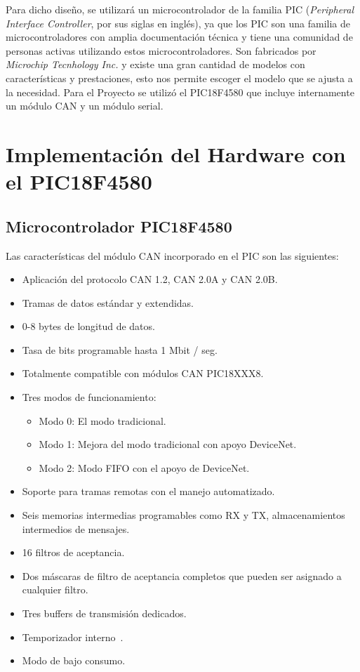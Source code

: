 

Para dicho diseño, se utilizará un microcontrolador de la familia PIC (\textit{Peripheral Interface Controller}, por sus siglas en inglés), ya que los PIC son una familia de microcontroladores con amplia documentación técnica y tiene una comunidad de personas activas utilizando estos microcontroladores. 
Son fabricados por \textit{Microchip Tecnhology Inc.} y existe una gran cantidad de modelos con características y prestaciones, esto nos permite escoger el modelo que se ajusta a la necesidad. 
Para el Proyecto se utilizó el PIC18F4580 que incluye internamente un módulo CAN y un módulo serial. 

\section{Implementación del Hardware con el PIC18F4580}
\subsection{Microcontrolador PIC18F4580}

Las características del módulo CAN incorporado en el PIC son las siguientes:
\begin{itemize}
	\item Aplicación del protocolo CAN 1.2,
	CAN 2.0A y CAN 2.0B.
	\item Tramas de datos estándar y extendidas.
	\item 0-8 bytes de longitud de datos.
	\item Tasa de bits programable hasta 1 Mbit / seg.
	\item Totalmente compatible con módulos CAN PIC18XXX8.
	\item Tres modos de funcionamiento:
	\begin{itemize}
		\item Modo 0: El modo tradicional.
		\item Modo 1: Mejora del modo tradicional con
		apoyo DeviceNet.
		\item Modo 2: Modo FIFO con el apoyo de DeviceNet.
		\end {itemize}
		\item Soporte para tramas remotas con el manejo automatizado.
		\item  Seis memorias intermedias programables como RX y TX, 
		almacenamientos intermedios de mensajes.
		\item 16 filtros de aceptancia.
		\item Dos máscaras de filtro de aceptancia completos que pueden ser asignado a cualquier filtro.
		\item Tres buffers de transmisión dedicados.
		\item Temporizador interno~\cite{DaP}.
		\item Modo de bajo consumo.
	\end{itemize}

